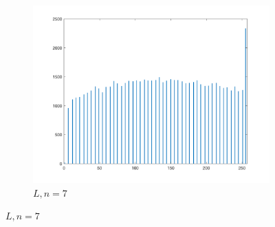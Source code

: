 \documentclass{article}
\begin{document}
\begin{enumerate}[label=(\alph*)]
\begin{figure}[!htb]
\begin{subfigure}[b]{0.3\textwidth}
            \includegraphics[width=\textwidth]{img/hist_L7.png}
            \caption{$L, n = 7$}
        \end{subfigure}
        
        

\end{figure}
\end{enumerate}
\end{document}
